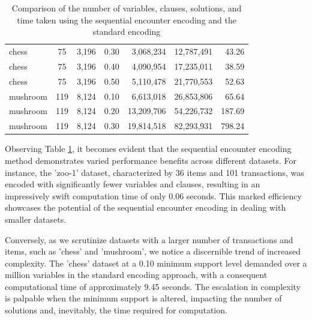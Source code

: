 \begin{table}[H]
\begin{tabular}{|l|c|c|c|r|r|r|}
        chess                             & 75                              & 3,196                           & 0.30                               & 3,068,234                                       & 12,787,491       & 43.26         \\
        chess                             & 75                              & 3,196                           & 0.40                               & 4,090,954                                       & 17,235,011       & 38.59         \\
        chess                             & 75                              & 3,196                           & 0.50                               & 5,110,478                                       & 21,770,553       & 52.63         \\
        mushroom                          & 119                             & 8,124                           & 0.10                               & 6,613,018                                       & 26,853,806       & 65.64         \\
        mushroom                          & 119                             & 8,124                           & 0.20                               & 13,209,706                                      & 54,226,732       & 187.69        \\
        mushroom                          & 119                             & 8,124                           & 0.30                               & 19,814,518                                      & 82,293,931       & 798.24        \\ \hline
    \end{tabular}
    \caption{Comparison of the number of variables, clauses, solutions, and time taken using the sequential encounter encoding and the standard encoding}
    \label{tab:result_benchmark_real_datasets}
\end{table}

Observing Table \ref{tab:result_benchmark_real_datasets}, it becomes evident
that the sequential encounter encoding method demonstrates varied performance benefits across different datasets.
For instance, the 'zoo-1' dataset, characterized by 36 items and 101 transactions,
was encoded with significantly fewer variables and clauses, resulting in an impressively swift computation time of
only 0.06 seconds. This marked efficiency showcases the potential of the sequential encounter encoding in dealing with
smaller datasets.

Conversely, as we scrutinize datasets with a larger number of transactions and items,
such as 'chess' and 'mushroom', we notice a discernible trend of increased complexity.
The 'chess' dataset at a 0.10 minimum support level demanded over a million variables in the standard encoding approach,
with a consequent computational time of approximately 9.45 seconds.
The escalation in complexity is palpable when the minimum support is altered,
impacting the number of solutions and, inevitably, the time required for computation.

